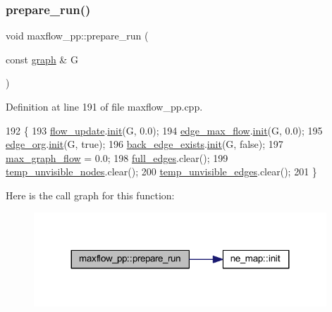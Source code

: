 \subsubsection{\texorpdfstring{prepare\+\_\+run()}{prepare\_run()}}
{\footnotesize\ttfamily void maxflow\+\_\+pp\+::prepare\+\_\+run (\begin{DoxyParamCaption}\item[{const \mbox{\hyperlink{classgraph}{graph}} \&}]{G }\end{DoxyParamCaption})\hspace{0.3cm}{\ttfamily [protected]}}



Definition at line 191 of file maxflow\+\_\+pp.\+cpp.


\begin{DoxyCode}
192 \{
193     \mbox{\hyperlink{classmaxflow__pp_ad37aff831935b2cfd4b03bc4a6da06ce}{flow\_update}}.\mbox{\hyperlink{classne__map_a4ef2ab4aebcb57a7a101975bf6a88e24}{init}}(G, 0.0);
194     \mbox{\hyperlink{classmaxflow__pp_a25d5bb2ab6c775a634dacf408ff55a83}{edge\_max\_flow}}.\mbox{\hyperlink{classne__map_a4ef2ab4aebcb57a7a101975bf6a88e24}{init}}(G, 0.0);
195     \mbox{\hyperlink{classmaxflow__pp_aca9ce457300e11b97cec3446315fda1c}{edge\_org}}.\mbox{\hyperlink{classne__map_a4ef2ab4aebcb57a7a101975bf6a88e24}{init}}(G, \textcolor{keyword}{true});
196     \mbox{\hyperlink{classmaxflow__pp_a50e9c82f1e720b8340ea4dc6d438f110}{back\_edge\_exists}}.\mbox{\hyperlink{classne__map_a4ef2ab4aebcb57a7a101975bf6a88e24}{init}}(G, \textcolor{keyword}{false});
197     \mbox{\hyperlink{classmaxflow__pp_abdda1871e70fd2de0f2006eff57dc94e}{max\_graph\_flow}} = 0.0;
198     \mbox{\hyperlink{classmaxflow__pp_a504adabbe1e7b11a910d6c43a6b71a75}{full\_edges}}.clear();
199     \mbox{\hyperlink{classmaxflow__pp_a0510a162f178364f36794e10022cda49}{temp\_unvisible\_nodes}}.clear();
200     \mbox{\hyperlink{classmaxflow__pp_aae17915904c0d17632df70aac9fe88b0}{temp\_unvisible\_edges}}.clear();
201 \}
\end{DoxyCode}
Here is the call graph for this function\+:\nopagebreak
\begin{figure}[H]
\begin{center}
\leavevmode
\includegraphics[width=311pt]{classmaxflow__pp_a7a738741f8050df0cb0be0381aef0825_cgraph}
\end{center}
\end{figure}
